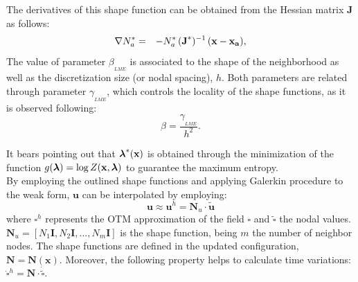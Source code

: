 \documentclass[applsci,journal,article,submit,moreauthors,pdftex]{Definitions/mdpi}
\begin{document}
The derivatives of this shape function can be obtained from the Hessian matrix \textbf{J} as follows:
\begin{eqnarray}
\nabla N^*_a &=& -N^*_a \,  (\textbf{J}^*)^{-1} \,  (\bf x-x_a) \label{eq_N3} ,
\end{eqnarray}
The value of parameter $\beta_{_{LME}}$ is associated to the shape of the neighborhood as well as the discretization size (or nodal spacing), $h$. Both parameters are related through parameter $\gamma_{_{LME}}$, which controls the locality of the shape functions, as it is observed following:
\begin{equation}\label{eqLM3}
\beta=\frac{\gamma_{_{LME}}}{h^2}.
\end{equation} 

It bears pointing out that $\boldsymbol{\lambda}^*(\bf x)$ is obtained through the minimization of the function $g(\boldsymbol{\lambda})=\log Z(\bf x, \boldsymbol{\lambda})$ to guarantee the maximum entropy.\\

By employing the outlined shape functions and applying Galerkin procedure to the weak form, $\boldsymbol{u}$ can be interpolated by employing:
\begin{equation} \label{eq_uwp1}
\boldsymbol{u} \approx  \boldsymbol{u}^h = \boldsymbol{N}_u \cdot \tilde{ \boldsymbol{u} }
\end{equation}
where $\square^h$ represents the OTM approximation of the field $\square$ and $\tilde{ \square } $ the nodal values.  $\boldsymbol{N}_u = [N_1 \boldsymbol{I}, N_2 \boldsymbol{I}, ..., N_m \boldsymbol{I}]$ is the shape function, being $m$ the number of neighbor nodes. The shape functions are defined in the updated configuration, $\boldsymbol{N} = \boldsymbol{N}(\boldsymbol{x})$. Moreover, the following property helps to calculate time variations:  $\dot{\square}^h =\boldsymbol{N} \cdot \dot{\tilde{\square}}$.
  
\end{document}
